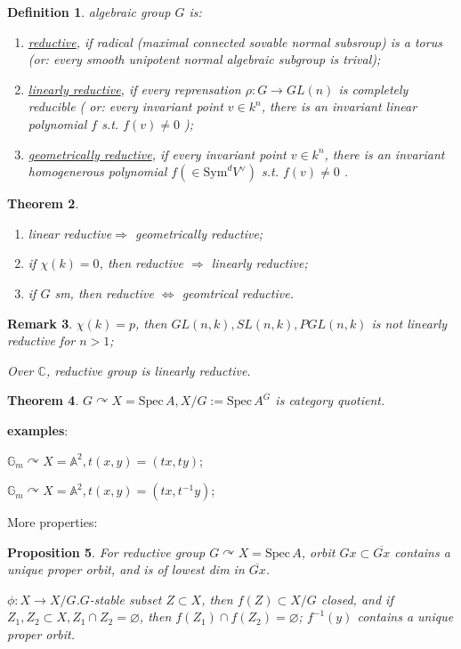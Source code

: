 \documentclass{article}
\newtheorem{defn}{Definition}[section]
\newtheorem{prop}[defn]{Proposition}
\newtheorem{thm}[defn]{Theorem}
\newtheorem{rmk}[defn]{Remark}
\newcommand{\Spec}{\mathrm{Spec}\,}
\begin{document}
\begin{defn}
	algebraic group $ G $ is:
	\begin{enumerate}
		\item \underline{reductive}, if radical (maximal connected sovable normal subsroup) is a torus (or: every smooth unipotent normal algebraic subgroup is trival);
		\item  \underline{linearly reductive}, if every reprensation $ \rho: G\to GL(n) $ is completely reducible ( or: every invariant point $ v\in k^n $, there is an invariant linear polynomial $ f $ s.t. $ f(v)\ne 0 $ );
		\item \underline{geometrically reductive}, if every invariant point $ v\in k^n $, there is an invariant homogenerous polynomial $ f (\in \mathrm{Sym}^d V^\vee  )$ s.t. $ f(v)\ne 0 $ .
	\end{enumerate}
\end{defn}

\begin{thm}
	\begin{enumerate}
		\item linear reductive$ \Rightarrow $ geometrically reductive;
		\item if $ \chi(k)=0 $, then reductive $ \Rightarrow $ linearly reductive;
		\item if $ G $ sm, then reductive $ \Leftrightarrow $ geomtrical reductive.
	\end{enumerate}
\end{thm}
\begin{rmk}
	$ \chi(k)=p $, then $ GL(n,k), SL(n,k), PGL(n,k) $ is not linearly reductive for $ n>1 $;
	
	Over $ \mathbb{C} $, reductive group is linearly reductive.
\end{rmk}



\begin{thm}
	$ G\curvearrowright X=\Spec A, X/G:=\Spec A^G $ is category quotient.
\end{thm}

 \textbf{examples}:
 
 $ \mathbb{G}_m\curvearrowright X=\mathbb{A}^2, t(x,y)=(tx,ty) $;
 
  $ \mathbb{G}_m\curvearrowright X=\mathbb{A}^2, t(x,y)=(tx,t^{-1}y) $;

More properties:
\begin{prop}
		For reductive group $ G\curvearrowright X=\mathrm{Spec}\,A $, orbit $ Gx\subset \overline{Gx} $ contains a unique proper orbit, and is of lowest dim in $ \overline{Gx} $. 
		
		$ \phi:X\to X/G $.$ G $-stable subset $ Z\subset{X} $, then $ f(Z) \subset X/G $ closed, and if $ Z_1,Z_2\subset X,Z_1\cap Z_2=\varnothing  $, then $ f(Z_1)\cap f(Z_2)=\varnothing $; $ f^{-1}(y) $ contains a unique proper orbit.
\end{prop}
\end{document}
